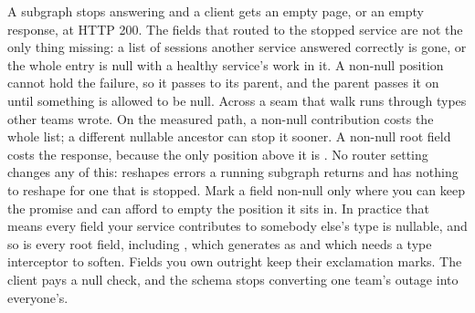 \begin{problemsummary}
{A subgraph stops answering and a client gets an empty page, or an empty
response, at HTTP 200. The fields that routed to the stopped service are not
the only thing missing: a list of sessions another service answered correctly
is gone, or the whole  entry is null with a healthy service's work
in it.}
{A non-null position cannot hold the failure, so it passes to its parent, and
the parent passes it on until something is allowed to be null. Across a seam
that walk runs through types other teams wrote. On the measured
 path, a non-null contribution costs the
whole list; a different nullable ancestor can stop it sooner. A non-null
root field costs the response, because the only position above it is
. No router
setting changes any of this:  reshapes errors
a running subgraph returns and has nothing to reshape for one that is stopped.}
{Mark a field non-null only where you can keep the promise and can afford to
empty the position it sits in. In practice that means every field your service
contributes to somebody else's type is nullable, and so is every root field,
including , which
 generates as \code{[Node]!} and which
needs a type interceptor to soften. Fields you own outright keep their
exclamation marks. The client pays a null check, and the schema stops
converting one team's outage into everyone's.}
\end{problemsummary}
